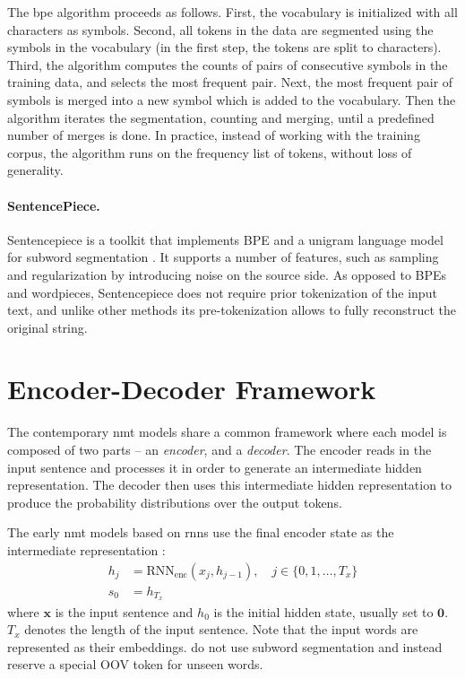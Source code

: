 The \gls{bpe} algorithm %
proceeds as follows. First, the vocabulary is initialized with all characters
as symbols. Second, all tokens in the data are segmented using the symbols in
the vocabulary (in the first step, the tokens are split to characters).  Third,
the algorithm computes the counts of pairs of consecutive symbols in the
training data, and selects the most frequent pair. Next, the most frequent pair
of symbols is merged into a new symbol which is added to the vocabulary. Then
the algorithm iterates the segmentation, counting and merging, until a
predefined number of merges is done. In practice, instead of working with the
training corpus, the algorithm runs on the frequency list of tokens, without
loss of generality.

\paragraph{SentencePiece.}   Sentencepiece
\citep{kudo2018sentencepiece} is a toolkit that implements BPE and a unigram
language model for subword segmentation \citep{kudo-2018-subword}. It supports a
number of features, such as sampling and regularization by introducing noise on
the source side. As opposed to BPEs and wordpieces, Sentencepiece does not
require prior tokenization of the input text, and unlike other methods its
pre-tokenization allows to fully reconstruct the original string.

\section{Encoder-Decoder Framework}
\label{sec:encdec}

The contemporary \gls{nmt} models share a common framework where each model is
composed of two parts -- an \emph{encoder}, and a \emph{decoder}. The encoder
reads in the input sentence and processes it in order to generate an
intermediate hidden representation.  The decoder then uses this intermediate
hidden representation to produce the probability distributions over the output
tokens.

The early \gls{nmt} models based on \glspl{rnn} use the final encoder state as
the intermediate representation \citep{sutskever2014sequence}:
%
\begin{align}
  h_j &= \mathrm{RNN}_{\text{enc}}(x_j, h_{j-1}), \quad j \in
          \{0, 1, \ldots, T_x \} \\
  s_0 &= h_{T_x}
\end{align}
%
where $\mathbf{x}$ is the input sentence and $h_0$ is the initial hidden state,
usually set to $\mathbf{0}$. $T_x$ denotes the length of the input sentence.
Note that the input words are represented as their embeddings.
\citet{sutskever2014sequence} do not use subword segmentation and instead
reserve a special OOV token for unseen words.

